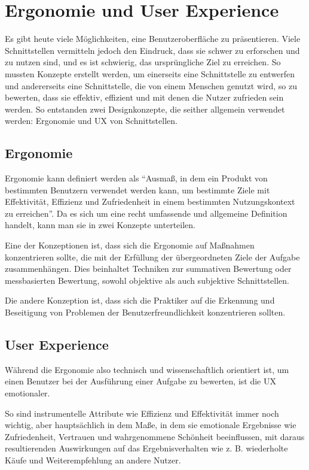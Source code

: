 \section{Ergonomie und User Experience}


Es gibt heute viele Möglichkeiten, eine Benutzeroberfläche zu präsentieren.
Viele Schnittstellen vermitteln jedoch den Eindruck, dass sie schwer zu erforschen und zu nutzen sind, und es ist schwierig, das ursprüngliche Ziel zu erreichen.
So mussten Konzepte erstellt werden, um einerseits eine Schnittstelle zu entwerfen und andererseits eine Schnittstelle, die von einem Menschen genutzt wird, so zu bewerten, dass sie effektiv, effizient und mit denen die Nutzer zufrieden sein werden.
So entstanden zwei Designkonzepte, die seither allgemein verwendet werden: Ergonomie und \ac{UX} von Schnittstellen.

\subsection{Ergonomie}

Ergonomie kann definiert werden als ``Ausmaß, in dem ein Produkt von bestimmten Benutzern verwendet werden kann, um bestimmte Ziele mit Effektivität, Effizienz und Zufriedenheit in einem bestimmten Nutzungskontext zu erreichen''\cite{usability}.
Da es sich um eine recht umfassende und allgemeine Definition handelt, kann man sie in zwei Konzepte unterteilen.

Eine der Konzeptionen ist, dass sich die Ergonomie auf Maßnahmen konzentrieren sollte, die mit der Erfüllung der übergeordneten Ziele der Aufgabe zusammenhängen. Dies beinhaltet Techniken zur summativen Bewertung oder messbasierten Bewertung, sowohl objektive als auch subjektive Schnittstellen.

Die andere Konzeption ist, dass sich die Praktiker auf die Erkennung und Beseitigung von Problemen der Benutzerfreundlichkeit konzentrieren sollten.

\subsection{User Experience}

Während die Ergonomie also technisch und wissenschaftlich orientiert ist, um einen Benutzer bei der Ausführung einer Aufgabe zu bewerten, ist die UX emotionaler.

So sind instrumentelle Attribute wie Effizienz und Effektivität immer noch wichtig, aber hauptsächlich in dem Maße, in dem sie emotionale Ergebnisse wie Zufriedenheit, Vertrauen und wahrgenommene Schönheit beeinflussen, mit daraus resultierenden Auswirkungen auf das Ergebnisverhalten wie z. B. wiederholte Käufe und Weiterempfehlung an andere Nutzer.

